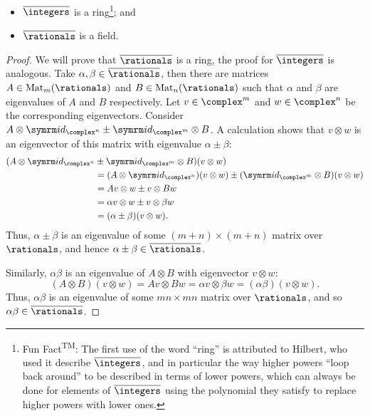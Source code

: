 \begin{prp}{}{}
    \begin{itemize}
        \item \(\algIntegers\) is a ring\footnote{Fun Fact\textsuperscript{TM}: The first use of the word \enquote{ring} is attributed to Hilbert, who used it describe \(\algIntegers\), and in particular the way higher powers \enquote{loop back around} to be described in terms of lower powers, which can always be done for elements of \(\algIntegers\) using the polynomial they satisfy to replace higher powers with lower ones.}; and
        \item \(\algNumbers\) is a field.
    \end{itemize}
    \begin{proof}
        We will prove that \(\algNumbers\) is a ring, the proof for \(\algIntegers\) is analogous.
        Take \(\alpha, \beta \in \algNumbers\), then there are matrices \(A \in \Mat_m(\rationals)\) and \(B \in \Mat_n(\rationals)\) such that \(\alpha\) and \(\beta\) are eigenvalues of \(A\) and \(B\) respectively.
        Let \(v \in \complex^m\) and \(w \in \complex^n\) be the corresponding eigenvectors.
        Consider \(A \otimes \id_{\complex^n} \pm \id_{\complex^{m}} \otimes B\).
        A calculation shows that \(v \otimes w\) is an eigenvector of this matrix with eigenvalue \(\alpha \pm \beta\):
        \begin{align}
            (A \otimes \id_{\complex^n} &\pm \id_{\complex^{m}} \otimes B)(v \otimes w)\\
            &= (A \otimes \id_{\complex^n})(v \otimes w) \pm (\id_{\complex^m} \otimes B)(v \otimes w)\\
            &= Av \otimes w \pm v \otimes Bw\\
            &= \alpha v \otimes w \pm v \otimes \beta w\\
            &= (\alpha \pm \beta) (v \otimes w).
        \end{align}
        Thus, \(\alpha \pm \beta\) is an eigenvalue of some \((m + n) \times (m + n)\) matrix over \(\rationals\), and hence \(\alpha \pm \beta \in \algNumbers\).
        
        Similarly, \(\alpha\beta\) is an eigenvalue of \(A \otimes B\) with eigenvector \(v \otimes w\):
        \begin{equation}
            (A \otimes B)(v \otimes w) = Av \otimes Bw = \alpha v \otimes \beta w = (\alpha\beta)(v \otimes w).
        \end{equation}
        Thus, \(\alpha\beta\) is an eigenvalue of some \(mn \times mn\) matrix over \(\rationals\), and so \(\alpha\beta \in \algNumbers\).
        

\end{proof}
\end{prp}
